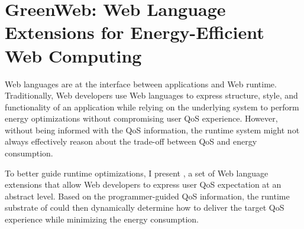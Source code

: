 
\chapter{GreenWeb: Web Language Extensions for Energy-Efficient Web Computing}
\label{sec:lang}


Web languages are at the interface between applications and Web runtime. Traditionally, Web developers use Web languages to express structure, style, and functionality of an application while relying on the underlying system to perform energy optimizations without compromising user QoS experience. However, without being informed with the QoS information, the runtime system might not always effectively reason about the trade-off between QoS and energy consumption.

To better guide runtime optimizations, I present \greenweb, a set of Web language extensions that allow Web developers to express user QoS expectation at an abstract level. Based on the programmer-guided QoS information, the runtime substrate of \greenweb could then dynamically determine how to deliver the target QoS experience while minimizing the energy consumption.


